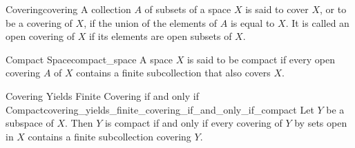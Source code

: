 \begin{definition}{Covering}{covering}
A collection $A$ of subsets of a space $X$ is said to cover $X$, or to be a covering of $X$, if the union of the elements of $A$ is equal to $X$. It is called an open covering of $X$ if its elements are open subsets of $X$.
\end{definition}

\begin{definition}{Compact Space}{compact_space}
A space $X$ is said to be compact if every open covering $A$ of $X$ contains a finite subcollection that also covers $X$.
\end{definition}

\begin{lemma}{Covering Yields Finite Covering if and only if Compact}{covering_yields_finite_covering_if_and_only_if_compact}
Let $Y$ be a subspace of $X$. Then $Y$ is compact if and only if every covering of $Y$ by sets open in $X$ contains a finite subcollection covering $Y$.
\end{lemma}


